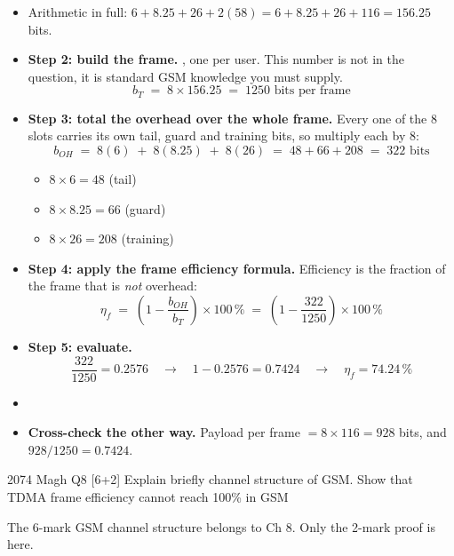 \begin{itemize}
  \item Arithmetic in full: \; $6 + 8.25 + 26 + 2(58) = 6 + 8.25 + 26 + 116 = 156.25$ bits.
  \item \textbf{Step 2: build the frame.} , one per user.
        This number is not in the question, it is standard GSM knowledge you must supply.
        \[ b_T \;=\; 8 \times 156.25 \;=\; 1250 \text{ bits per frame} \]
  \item \textbf{Step 3: total the overhead over the whole frame.} Every one of the 8 slots
        carries its own tail, guard and training bits, so multiply each by 8:
        \[ b_{OH} \;=\; 8(6) \;+\; 8(8.25) \;+\; 8(26) \;=\; 48 + 66 + 208 \;=\; 322
           \text{ bits} \]
  \begin{itemize}
    \item $8 \times 6 = 48$ \; (tail) \; \item $8 \times 8.25 = 66$ \; (guard)
    \item $8 \times 26 = 208$ \; (training)
  \end{itemize}
  \item \textbf{Step 4: apply the frame efficiency formula.} Efficiency is the fraction of the
        frame that is \emph{not} overhead:
        \[ \eta_f \;=\; \left(1 - \frac{b_{OH}}{b_T}\right) \times 100\,\%
           \;=\; \left(1 - \frac{322}{1250}\right) \times 100\,\% \]
  \item \textbf{Step 5: evaluate.}
        \[ \frac{322}{1250} = 0.2576 \quad\rightarrow\quad
           1 - 0.2576 = 0.7424 \quad\rightarrow\quad \eta_f = 74.24\,\% \]
  \item {}
  \item \textbf{Cross-check the other way.} Payload per frame $= 8 \times 116 = 928$ bits, and
        $928/1250 = 0.7424$. 
\end{itemize}

\begin{asked}{2074 Magh \textperiodcentered{} Q8 \textperiodcentered{} [6+2]}
Explain briefly channel structure of GSM. Show that TDMA frame efficiency cannot reach 100\% in
GSM
\par\vspace{1pt}
{\color{sub}The 6-mark GSM channel structure belongs to Ch 8. Only the 2-mark proof is here.}
\end{asked}


